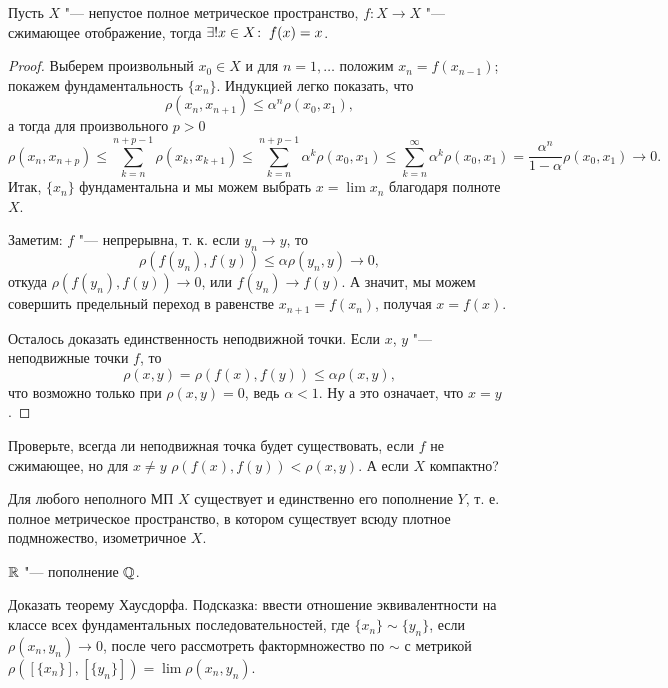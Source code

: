 \documentclass[main]{subfiles}
\begin{document}
\begin{theorem}
  Пусть \( X \) "--- непустое полное метрическое пространство,
  \( f : X \to X \) "--- сжимающее отображение,
  тогда \( \exists! x \in X \colon \: f(x) = x \).
\end{theorem}
\begin{proof}
  Выберем произвольный \( x_0 \in X \) и для
  \( n = 1, \dots \) положим \( x_{n} = f(x_{n - 1}) \);
  покажем фундаментальность \( \{ x_n \} \).
  Индукцией легко показать, что
  \[
    \rho(x_n, x_{n+1}) \le \alpha^n \rho(x_0, x_1),
  \]
  а тогда для произвольного \( p > 0 \)
  \[
    \rho(x_n, x_{n+p}) \le
    \sum_{k = n}^{n + p - 1} \rho(x_k, x_{k + 1}) \le
    \sum_{k = n}^{n + p - 1} \alpha^k \rho(x_0, x_1) \le
    \sum_{k = n}^\infty \alpha^k \rho(x_0, x_1) =
    \frac{\alpha^n}{1 - \alpha} \rho(x_0, x_1) \to 0.
  \]
  Итак, \( \{ x_n \} \) фундаментальна и мы можем выбрать
  \( x = \lim x_n \) благодаря полноте \( X \).

  Заметим: \( f \) "--- непрерывна, т. к.
  если \( y_n \to y \), то
  \[
    \rho(f(y_n), f(y)) \le \alpha \rho(y_n, y) \to 0,
  \]
  откуда \( \rho(f(y_n), f(y)) \to 0 \), или
  \( f(y_n) \to f(y) \).
  А значит, мы можем совершить предельный переход
  в равенстве \( x_{n + 1} = f(x_n) \), получая
  \( x = f(x) \).

  Осталось доказать единственность неподвижной точки.
  Если \( x \), \( y \) "--- неподвижные точки \( f \),
  то
  \[
    \rho(x, y) = \rho(f(x), f(y)) \le \alpha \rho(x, y),
  \]
  что возможно только при \( \rho(x, y) = 0 \),
  ведь \( \alpha < 1 \). Ну а это означает, что \( x = y \).
\end{proof}

\begin{exercise}
  Проверьте, всегда ли неподвижная точка будет существовать,
  если \( f \) не сжимающее, но для \( x \ne y \)
  \( \rho(f(x), f(y)) < \rho(x, y) \). А если \( X \) компактно?
\end{exercise}

\begin{theorem}[Хаусдорф, б/д]
  Для любого неполного МП \( X \) существует и единственно его
  пополнение \( Y \), т. е. полное метрическое пространство,
  в котором существует всюду плотное подмножество, изометричное \( X \).
\end{theorem}

\begin{example}
  \( \mathbb{R} \) "--- пополнение \( \mathbb{Q} \).
\end{example}

\begin{exercise}
  Доказать теорему Хаусдорфа. Подсказка: ввести
  отношение эквивалентности на классе всех
  фундаментальных последовательностей,
  где \( \{ x_n \} \sim \{ y_n \} \),
  если \( \rho(x_n, y_n) \to 0 \),
  после чего рассмотреть фактормножество по \( \sim \)
  с метрикой
  \( \rho([\{ x_n \}], [\{ y_n \}]) = \lim \rho(x_n, y_n) \).
\end{exercise}
\end{document}
